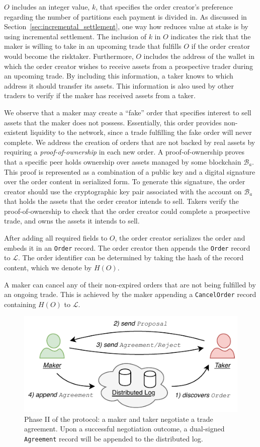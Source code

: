 $ O $ includes an integer value, $ k $, that specifies the order creator's preference regarding the number of partitions each payment is divided in.
As discussed in Section~\ref{sec:incremental_settlement}, one way how \ModelName{} reduces value at stake is by using incremental settlement.
The inclusion of $ k $ in $ O $ indicates the risk that the maker is willing to take in an upcoming trade that fulfills $ O $ if the order creator would become the risktaker.
Furthermore, $ O $ includes the address of the wallet in which the order creator wishes to receive assets from a prospective trader during an upcoming trade.
By including this information, a taker knows to which address it should transfer its assets.
This information is also used by other traders to verify if the maker has received assets from a taker.

We observe that a maker may create a \enquote{fake} order that specifies interest to sell assets that the maker does not possess.
Essentially, this order provides non-existent liquidity to the \ModelName{} network, since a trade fulfilling the fake order will never complete.
We address the creation of orders that are not backed by real assets by requiring a \emph{proof-of-ownership} in each new order.
A proof-of-ownership proves that a specific peer holds ownership over assets managed by some blockchain $ \mathcal{B}_a $.
This proof is represented as a combination of a public key and a digital signature over the order content in serialized form.
To generate this signature, the order creator should use the cryptographic key pair associated with the account on $ \mathcal{B}_a $ that holds the assets that the order creator intends to sell.
Takers verify the proof-of-ownership to check that the order creator could complete a prospective trade, and owns the assets it intends to sell.

After adding all required fields to $ O $, the order creator serializes the order and embeds it in an \texttt{Order} record.
The order creator then appends the \texttt{Order} record to $ \mathcal{L} $.
The order identifier can be determined by taking the hash of the record content, which we denote by $ H(O) $.

A maker can cancel any of their non-expired orders that are not being fulfilled by an ongoing trade.
This is achieved by the maker appending a \texttt{CancelOrder} record containing $ H(O) $ to $ \mathcal{L} $.

\begin{figure}[h]
	\centering
	\includegraphics[width=0.6\linewidth]{xchange/assets/xchange_protocol_2}
	\caption{Phase II of the \ModelName{} protocol: a maker and taker negotiate a trade agreement. Upon a successful negotiation outcome, a dual-signed \texttt{Agreement} record will be appended to the distributed log.}
	\label{fig:matching_protocol_2}
\end{figure}

